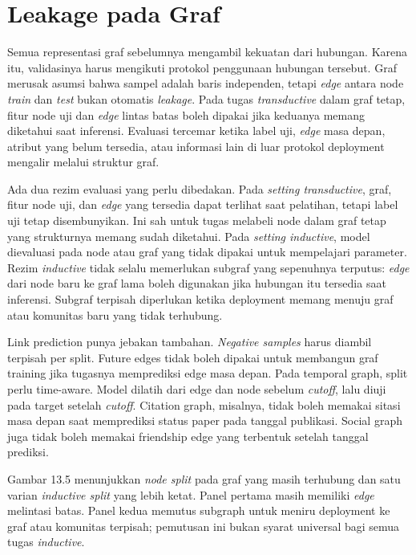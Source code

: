 \section{Leakage pada Graf}\label{leakage-pada-graf}

Semua representasi graf sebelumnya mengambil kekuatan dari hubungan. Karena itu, validasinya harus mengikuti protokol penggunaan hubungan tersebut. Graf merusak asumsi bahwa sampel adalah baris independen, tetapi \emph{edge} antara node \emph{train} dan \emph{test} bukan otomatis \emph{leakage}. Pada tugas \emph{transductive} dalam graf tetap, fitur node uji dan \emph{edge} lintas batas boleh dipakai jika keduanya memang diketahui saat inferensi. Evaluasi tercemar ketika label uji, \emph{edge} masa depan, atribut yang belum tersedia, atau informasi lain di luar protokol deployment mengalir melalui struktur graf.

Ada dua rezim evaluasi yang perlu dibedakan. Pada \emph{setting transductive}, graf, fitur node uji, dan \emph{edge} yang tersedia dapat terlihat saat pelatihan, tetapi label uji tetap disembunyikan. Ini sah untuk tugas melabeli node dalam graf tetap yang strukturnya memang sudah diketahui. Pada \emph{setting inductive}, model dievaluasi pada node atau graf yang tidak dipakai untuk mempelajari parameter. Rezim \emph{inductive} tidak selalu memerlukan subgraf yang sepenuhnya terputus: \emph{edge} dari node baru ke graf lama boleh digunakan jika hubungan itu tersedia saat inferensi. Subgraf terpisah diperlukan ketika deployment memang menuju graf atau komunitas baru yang tidak terhubung.

Link prediction punya jebakan tambahan. \emph{Negative samples} harus diambil terpisah per split. Future edges tidak boleh dipakai untuk membangun graf training jika tugasnya memprediksi edge masa depan. Pada temporal graph, split perlu time-aware. Model dilatih dari edge dan node sebelum \emph{cutoff}, lalu diuji pada target setelah \emph{cutoff}. Citation graph, misalnya, tidak boleh memakai sitasi masa depan saat memprediksi status paper pada tanggal publikasi. Social graph juga tidak boleh memakai friendship edge yang terbentuk setelah tanggal prediksi.

Gambar 13.5 menunjukkan \emph{node split} pada graf yang masih terhubung dan satu varian \emph{inductive split} yang lebih ketat. Panel pertama masih memiliki \emph{edge} melintasi batas. Panel kedua memutus subgraph untuk meniru deployment ke graf atau komunitas terpisah; pemutusan ini bukan syarat universal bagi semua tugas \emph{inductive}.


